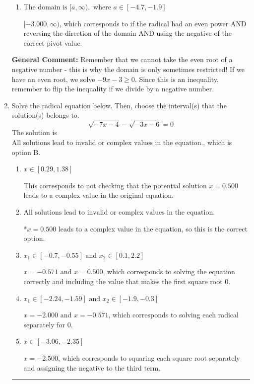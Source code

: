 \documentclass{extbook}[14pt]
\newcommand{\litem}[1]{\item #1

\rule{\textwidth}{0.4pt}}
\begin{document}
\begin{enumerate}
{\begin{enumerate}[label=\Alph*.]
$(-\infty, -3.000]$, which corresponds to if the radical had an even power AND using the negative of the correct pivot value.
\item \( \text{The domain is } [a, \infty), \text{   where } a \in [-4.7, -1.9] \)

$[-3.000, \infty)$, which corresponds to if the radical had an even power AND reversing the direction of the domain AND using the negative of the correct pivot value.
\end{enumerate}

\textbf{General Comment:} Remember that we cannot take the even root of a negative number - this is why the domain is only sometimes restricted! If we have an even root, we solve $-9 x - 3 \geq 0$. Since this is an inequality, remember to flip the inequality if we divide by a negative number.
}
\litem{
Solve the radical equation below. Then, choose the interval(s) that the solution(s) belongs to.
\[ \sqrt{-7 x - 4} - \sqrt{-3 x - 6} = 0 \]The solution is \( \text{All solutions lead to invalid or complex values in the equation.} \), which is option B.\begin{enumerate}[label=\Alph*.]
\item \( x \in [0.29,1.38] \)

This corresponds to not checking that the potential solution $x = 0.500$ leads to a complex value in the original equation.
\item \( \text{All solutions lead to invalid or complex values in the equation.} \)

*$x = 0.500$ leads to a complex value in the equation, so this is the correct option.
\item \( x_1 \in [-0.7, -0.55] \text{ and } x_2 \in [0.1,2.2] \)

$x = -0.571$ and $x = 0.500$, which corresponds to solving the equation correctly and including the value that makes the first square root 0.
\item \( x_1 \in [-2.24, -1.59] \text{ and } x_2 \in [-1.9,-0.3] \)

$x = -2.000$ and $x = -0.571$, which corresponds to solving each radical separately for 0.
\item \( x \in [-3.06,-2.35] \)

$x = -2.500$, which corresponds to squaring each square root separately and assigning the negative to the third term.
\end{enumerate}

}
\end{enumerate}
\end{document}
